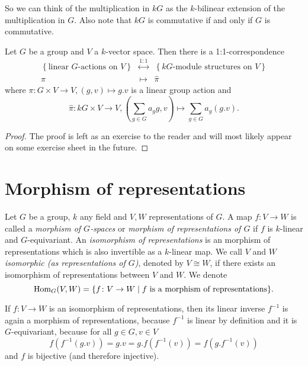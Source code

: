 So we can think of the multiplication in $kG$ as the $k$-bilinear extension of the multiplication in $G$. Also note that $kG$ is commutative if and only if $G$ is commutative.


\begin{lem}
 Let $G$ be a group and $V$ a $k$-vector space. Then there is a 1:1-correspondence
 \[
 \begin{matrix}
    \left\{\text{linear $G$-actions on $V$}\right\}
  & \overset{1:1}{\longleftrightarrow}
  & \left\{\text{$kG$-module structures on $V$}\right\} \\
    \pi
  & \longmapsto
  & \hat{\pi}
  \end{matrix}
 \]
 where $\pi \colon G \times V \to V, (g,v) \mapsto g.v$ is a linear group action and
 \[
  \hat{\pi} \colon kG \times V \to V, \left(\sum_{g \in G} a_g g, v\right) \mapsto \sum_{g \in G} a_g (g.v).
 \]
\end{lem}
\begin{proof}
 The proof is left as an exercise to the reader and will most likely appear on some exercise sheet in the future.
\end{proof}





\section{Morphism of representations}


\begin{defi}
Let $G$ be a group, $k$ any field and $V,W$ representations of $G$. A map $f \colon V \to W$ is called a \emph{morphism of $G$-spaces} or \emph{morphism of representations of $G$} if $f$ is $k$-linear and $G$-equivariant. An \emph{isomorphism of representations} is an morphism of representations which is also invertible as a $k$-linear map. We call $V$ and $W$ \emph{isomorphic (as representations of $G$)}, denoted by $V \cong W$, if there exists an isomorphism of representations between $V$ and $W$. We denote
\[
 \operatorname{Hom}_G(V,W) = \{f \colon V \to W \mid f \text{ is a morphism of representations}\}.
\]
\end{defi}


\begin{rem}
 If $f \colon V \to W$ is an isomorphism of representations, then its linear inverse $f^{-1}$ is again a morphism of representations, because $f^{-1}$ is linear by definition and it is $G$-equivariant, because for all $g \in G, v \in V$
 \[
  f\left(f^{-1}(g.v)\right) = g.v = g.f\left(f^{-1}(v)\right) = f\left(g.f^{-1}(v)\right)
 \]
 and $f$ is bijective (and therefore injective).
\end{rem}


